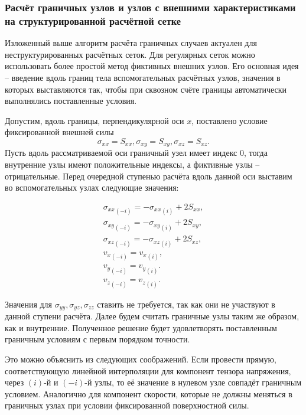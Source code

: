 \subsubsection{Расчёт граничных узлов и узлов с внешними характеристиками на структурированной расчётной сетке}
Изложенный выше алгоритм расчёта граничных случаев актуален для неструктурированных расчётных сеток. Для регулярных сеток можно использовать более простой метод фиктивных внешних узлов. Его основная идея -- введение вдоль границ тела вспомогательных расчётных узлов, значения в которых выставляются так, чтобы при сквозном счёте границы  автоматически выполнялись поставленные условия. 

Допустим, вдоль границы, перпендикулярной оси $x$, поставлено условие фиксированной внешней силы
\begin{equation}
	\sigma_{xx} = S_{xx}, \sigma_{xy} = S_{xy}, \sigma_{xz} = S_{xz}.
\end{equation}
Пусть вдоль рассматриваемой оси граничный узел имеет индекс 0, тогда внутренние узлы имеют положительные индексы, а фиктивные узлы -- отрицательные. Перед очередной ступенью расчёта вдоль данной оси выставим во вспомогательных узлах следующие значения:

\begin{eqnarray}
	{\sigma_{xx}}_{(-i)} = -{\sigma_{xx}}_{(i)} + 2S_{xx}, \\
	{\sigma_{xy}}_{(-i)} = -{\sigma_{xy}}_{(i)} + 2S_{xy}, \\
	{\sigma_{xz}}_{(-i)} = -{\sigma_{xz}}_{(i)} + 2S_{xz}, \\
	{v_x}_{(-i)} = {v_x}_{(i)}, \\
	{v_y}_{(-i)} = {v_y}_{(i)}. \\
	{v_z}_{(-i)} = {v_z}_{(i)}.
\end{eqnarray}

Значения для $ \sigma_{yy}, \sigma_{yz}, \sigma_{zz} $ ставить не требуется, так как они не участвуют в данной ступени расчёта. Далее будем считать граничные узлы таким же образом, как и внутренние. Полученное решение будет удовлетворять поставленным граничным условиям с первым порядком точности. 

Это можно объяснить из следующих соображений. Если провести прямую, соответствующую линейной интерполяции для компонент тензора напряжения, через $(i)$-й и $(-i)$-й узлы, то её значение в нулевом узле совпадёт граничным условием. Аналогично для компонент скорости, которые не должны меняться в граничных узлах при условии фиксированной поверхностной силы.

